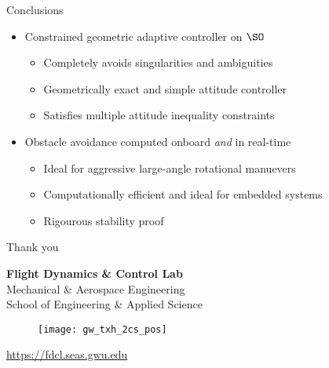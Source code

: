 \begin{frame}{Conclusions} %

    \begin{itemize}
        \item Constrained geometric adaptive controller on \( \SO \)
        \begin{itemize}
            \item Completely avoids singularities and ambiguities 
            \item Geometrically exact and simple attitude controller
            \item Satisfies multiple attitude inequality constraints 
        \end{itemize}
        \pause
        \vs
        \item Obstacle avoidance computed onboard \emph{and} in real-time
        \begin{itemize}
            \item Ideal for aggressive large-angle rotational manuevers
            \item Computationally efficient and ideal for embedded systems 
            \item Rigourous stability proof 
        \end{itemize}
    \end{itemize}

\end{frame}   %

\begin{frame}[c]{Thank you}
    \centering
    
    \textbf{\large Flight Dynamics \& Control Lab} \\
    Mechanical \& Aerospace Engineering \\
    School of Engineering \& Applied Science
    
    \begin{figure} %
        \texttt{[image: gw\_txh\_2cs\_pos]}
    \end{figure}
    
    \url{https://fdcl.seas.gwu.edu}
\end{frame}


